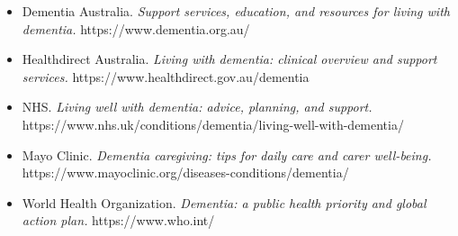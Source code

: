 \begin{itemize}
    \item Dementia Australia. \textit{Support services, education, and resources for living with dementia.} https://www.dementia.org.au/
    \item Healthdirect Australia. \textit{Living with dementia: clinical overview and support services.} https://www.healthdirect.gov.au/dementia
    \item NHS. \textit{Living well with dementia: advice, planning, and support.} https://www.nhs.uk/conditions/dementia/living-well-with-dementia/
    \item Mayo Clinic. \textit{Dementia caregiving: tips for daily care and carer well-being.} https://www.mayoclinic.org/diseases-conditions/dementia/
    \item World Health Organization. \textit{Dementia: a public health priority and global action plan.} https://www.who.int/
\end{itemize}
